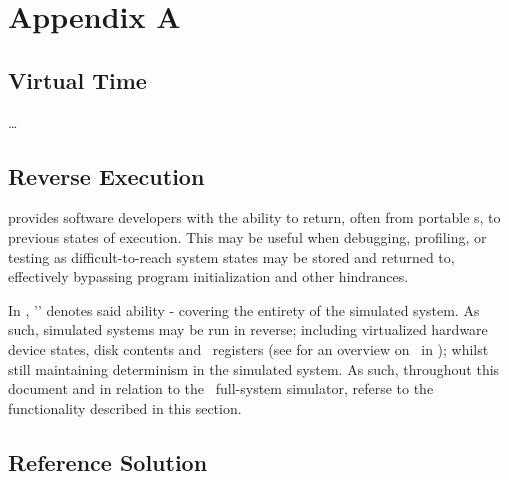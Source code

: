 

\chapter*{Appendix A}
\label{cha:appendixa}

\section*{Virtual Time}
\label{sec:appendixa_virtualtime}
\ldots

\section*{Reverse Execution}
\label{sec:appendixa_reverseexecution}

 provides software developers with the ability to return, often from portable \dvttermcheckpoint s, to previous states of execution.
This may be useful when debugging, profiling, or testing as difficult-to-reach system states may be stored and returned to, effectively bypassing program initialization and other hindrances.

In \dvttermsimics , '\dvttermreverseexecution ' denotes said ability - covering the entirety of the simulated system.
As such, simulated systems may be run in reverse; including virtualized hardware device states, disk contents and \dvttermcpu\ registers (see  for an overview on \dvttermreverseexecution\ in \dvttermsimics ); whilst still maintaining determinism in the simulated system.
As such, throughout this document and in relation to the \dvttermsimics\ full-system simulator, \dvttermreverseexecution referse to the functionality described in this section.

\section*{Reference Solution}
\label{sec:appendixa_referencesolution}

